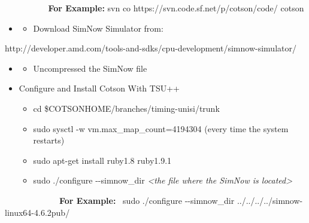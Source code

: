\documentclass[a4paper]{article}
\begin{document}
{
\textbf{\ \ \ \ \ \ \ }\textbf{\ \  For Example:} svn co
https://svn.code.sf.net/p/cotson/code/ cotson}

\begin{itemize}
\item \begin{itemize}
\item {
Download SimNow Simulator from: }
\end{itemize}
\end{itemize}
{
http://developer.amd.com/tools-and-sdks/cpu-development/simnow-simulator/}

\begin{itemize}
\item \begin{itemize}
\item {
Uncompressed the SimNow file}
\end{itemize}
\end{itemize}

\bigskip

\begin{itemize}
\item {
Configure and Install Cotson With TSU++}

\begin{itemize}
\item {
cd \$COTSONHOME/branches/timing-unisi/trunk}
\item {
sudo sysctl -w vm.max\_map\_count=4194304 (every time the system
restarts)}
\item {
sudo apt-get install ruby1.8 ruby1.9.1}
\item {
sudo ./configure -{}-simnow\_dir \textit{{\textless}the file where the
SimNow is located{\textgreater}}}
\end{itemize}
\end{itemize}
{
\ \ \ \ \ \ \ \ \ \ \ \ \ \textbf{For Example:} \ sudo ./configure
-{}-simnow\_dir ../../../../simnow-linux64-4.6.2pub/}
\end{document}
